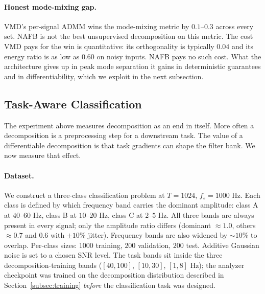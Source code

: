 \documentclass[journal]{IEEEtran}
\theoremstyle{remark}
\begin{document}
\paragraph{Honest mode-mixing gap.}
VMD's per-signal ADMM wins the mode-mixing metric by $0.1$--$0.3$
across every set. NAFB is not the best unsupervised decomposition on
this metric. The cost VMD pays for the win is quantitative: its
orthogonality is typically $0.04$ and its energy ratio is as low as
$0.60$ on noisy inputs. NAFB pays no such cost. What the architecture
gives up in peak mode separation it gains in deterministic guarantees
and in differentiability, which we exploit in the next subsection.

\subsection{Task-Aware Classification}
\label{sec:taskaware}

The experiment above measures decomposition as an end in itself. More
often a decomposition is a preprocessing step for a downstream task.
The value of a differentiable decomposition is that task gradients can
shape the filter bank. We now measure that effect.

\paragraph{Dataset.}
We construct a three-class classification problem at $T = 1024$, $f_{s}
= 1000$ Hz. Each class is defined by which frequency band carries the
dominant amplitude: class A at $40$--$60$ Hz, class B at $10$--$20$ Hz,
class C at $2$--$5$ Hz. All three bands are always present in every
signal; only the amplitude ratio differs (dominant $\approx 1.0$,
others $\approx 0.7$ and $0.6$ with $\pm 10\%$ jitter). Frequency bands
are also widened by $\sim\!10\%$ to overlap. Per-class sizes: $1000$
training, $200$ validation, $200$ test. Additive Gaussian noise is set
to a chosen SNR level. The task bands sit inside the three
decomposition-training bands ($[40,100]$, $[10,30]$, $[1,8]$ Hz);
the analyzer checkpoint was trained on the decomposition distribution
described in Section~\ref{subsec:training} \emph{before} the
classification task was designed.
\end{document}
